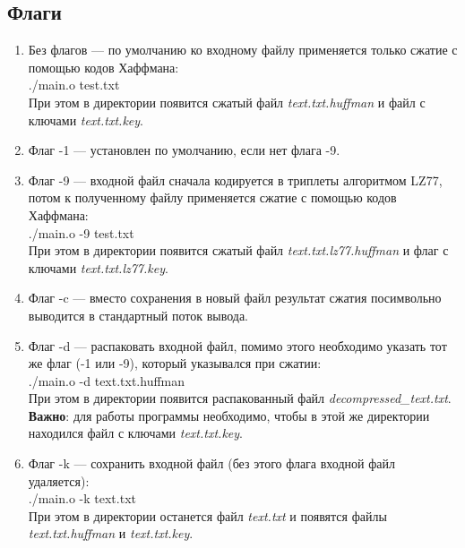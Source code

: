 \documentclass[12pt]{article}
\begin{document}
    \subsection*{Флаги}
    \begin{enumerate}
        \item Без флагов — по умолчанию ко входному файлу применяется только 
        сжатие с помощью кодов Хаффмана: \\
        ./main.o test.txt \\
        При этом в директории появится сжатый файл \textit{text.txt.huffman} и 
        файл с ключами \textit{text.txt.key}.

        \item Флаг -1 — установлен по умолчанию, если нет флага -9.

        \item Флаг -9 — входной файл сначала кодируется в триплеты алгоритмом 
        LZ77, потом к полученному файлу применяется сжатие с помощью кодов 
        Хаффмана: \\
        ./main.o -9 test.txt \\
        При этом в директории появится сжатый файл 
        \textit{text.txt.lz77.huffman} и флаг с ключами 
        \textit{text.txt.lz77.key}.

        \item Флаг -c — вместо сохранения в новый файл результат сжатия 
        посимвольно выводится в стандартный поток вывода.

        \item Флаг -d — распаковать входной файл, помимо этого необходимо 
        указать тот же флаг (-1 или -9), который указывался при сжатии: \\
        ./main.o -d text.txt.huffman \\
        При этом в директории появится распакованный файл 
        \textit{decompressed\_text.txt}. \\ \textbf{Важно}: для работы 
        программы необходимо, чтобы в этой же директории находился файл с 
        ключами \textit{text.txt.key}.

        \item Флаг -k — сохранить входной файл (без этого флага входной файл 
        удаляется): \\
        ./main.o -k text.txt \\
        При этом в директории останется файл \textit{text.txt} и появятся файлы 
        \textit{text.txt.huffman} и \textit{text.txt.key}.


\end{enumerate}
\end{document}
